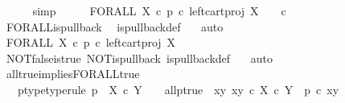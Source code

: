 \begin{isabellebody}
\ \ \ \ \isamarkupfalse%
\ simp\isanewline
\ \ \isamarkupfalse%
\ \isamarkupfalse%
\ {\isachardoublequoteopen}FORALL\ X\ {\isasymcirc}\isactrlsub c\ {\isacharparenleft}{\kern0pt}p\ {\isasymcirc}\isactrlsub c\ left{\isacharunderscore}{\kern0pt}cart{\isacharunderscore}{\kern0pt}proj\ X\ {\isasymone}{\isacharparenright}{\kern0pt}\isactrlsup {\isasymsharp}\ {\isacharequal}{\kern0pt}\ {\isasymt}\ {\isasymcirc}\isactrlsub c\ {\isasymbeta}\isactrlbsub {\isasymone}\isactrlesub {\isachardoublequoteclose}\isanewline
\ \ \ \ \isamarkupfalse%
\ FORALL{\isacharunderscore}{\kern0pt}is{\isacharunderscore}{\kern0pt}pullback\ \isamarkupfalse%
\ is{\isacharunderscore}{\kern0pt}pullback{\isacharunderscore}{\kern0pt}def\ \ \isamarkupfalse%
\ auto\isanewline
\ \ \isamarkupfalse%
\ \isamarkupfalse%
\ {\isachardoublequoteopen}FORALL\ X\ {\isasymcirc}\isactrlsub c\ {\isacharparenleft}{\kern0pt}p\ {\isasymcirc}\isactrlsub c\ left{\isacharunderscore}{\kern0pt}cart{\isacharunderscore}{\kern0pt}proj\ X\ {\isasymone}{\isacharparenright}{\kern0pt}\isactrlsup {\isasymsharp}\ {\isacharequal}{\kern0pt}\ {\isasymt}{\isachardoublequoteclose}\isanewline
\ \ \ \ \isamarkupfalse%
\ NOT{\isacharunderscore}{\kern0pt}false{\isacharunderscore}{\kern0pt}is{\isacharunderscore}{\kern0pt}true\ NOT{\isacharunderscore}{\kern0pt}is{\isacharunderscore}{\kern0pt}pullback\ is{\isacharunderscore}{\kern0pt}pullback{\isacharunderscore}{\kern0pt}def\ \ \isamarkupfalse%
\ auto\isanewline
{}\isamarkupfalse%
%
\endisatagproof
{\isafoldproof}%
%
\isadelimproof
\isanewline
%
\endisadelimproof
\isanewline
{}\isamarkupfalse%
\ all{\isacharunderscore}{\kern0pt}true{\isacharunderscore}{\kern0pt}implies{\isacharunderscore}{\kern0pt}FORALL{\isacharunderscore}{\kern0pt}true{}{\isacharcolon}{\kern0pt}\isanewline
\ \ \ p{\isacharunderscore}{\kern0pt}type{\isacharbrackleft}{\kern0pt}type{\isacharunderscore}{\kern0pt}rule{\isacharbrackright}{\kern0pt}{\isacharcolon}{\kern0pt}\ {\isachardoublequoteopen}p\ {\isacharcolon}{\kern0pt}\ X\ {\isasymtimes}\isactrlsub c\ Y\ {\isasymrightarrow}\ {\isasymOmega}{\isachardoublequoteclose}\ \ all{\isacharunderscore}{\kern0pt}p{\isacharunderscore}{\kern0pt}true{\isacharcolon}{\kern0pt}\ {\isachardoublequoteopen}{\isasymAnd}\ xy{\isachardot}{\kern0pt}\ xy\ {\isasymin}\isactrlsub c\ X\ {\isasymtimes}\isactrlsub c\ Y\ {\isasymLongrightarrow}\ p\ {\isasymcirc}\isactrlsub c\ xy\ {\isacharequal}{\kern0pt}\ {\isasymt}{\isachardoublequoteclose}\isanewline

\end{isabellebody}
